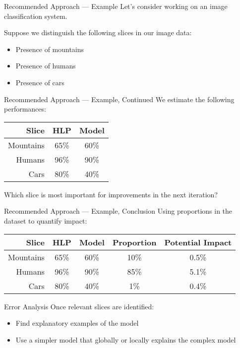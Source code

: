 \begin{frame}{Recommended Approach — Example}
  Let's consider working on an image classification system.
  
  Suppose we distinguish the following slices in our image data:
  
  \begin{itemize}
    \item Presence of mountains
    \item Presence of humans
    \item Presence of cars
  \end{itemize}
\end{frame}

\begin{frame}{Recommended Approach — Example, Continued}
  We estimate the following performances:
  
  \begin{tabular}{rcc}
    \toprule
    Slice      & HLP  & Model \\
    \midrule
    Mountains  & 65\% & 60\%  \\
    Humans     & 96\% & 90\%  \\
    Cars       & 80\% & 40\%  \\
    \bottomrule
  \end{tabular}
  
  Which slice is most important for improvements in the next iteration?
\end{frame}

\begin{frame}{Recommended Approach — Example, Conclusion}
  Using proportions in the dataset to quantify impact:
  
  \begin{tabular}{rcccc}
    \toprule
    Slice      & HLP  & Model & Proportion & Potential Impact \\
    \midrule
    Mountains  & 65\% & 60\%  & 10\%       & 0.5\% \\
    Humans     & 96\% & 90\%  & 85\%       & 5.1\% \\
    Cars       & 80\% & 40\%  & 1\%        & 0.4\% \\
    \bottomrule
  \end{tabular}
\end{frame}

\begin{frame}{Error Analysis}
  Once relevant slices are identified:
  
  \begin{itemize}
    \item Find explanatory examples of the model
    \item Use a simpler model that globally or locally explains the complex model
  \end{itemize}
\end{frame}

